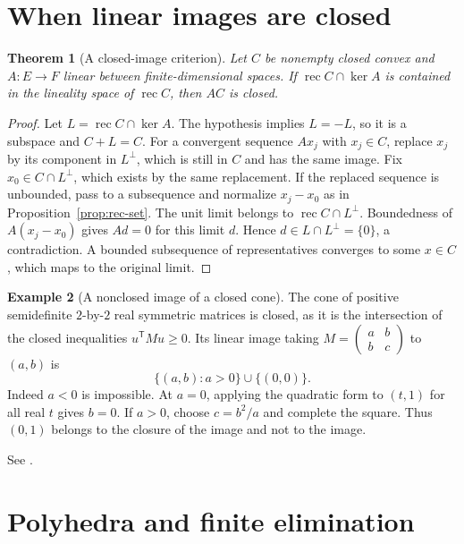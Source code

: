 \documentclass[11pt,oneside,openany]{book}
\theoremstyle{plain}
\newtheorem{theorem}{Theorem}[chapter]
\theoremstyle{definition}
\newtheorem{example}[theorem]{Example}
\theoremstyle{remark}
\begin{document}
\section{When linear images are closed}\label{v01-07}

\begin{theorem}[A closed-image criterion]\label{thm:closed-image}
Let \(C\) be nonempty closed convex and \(A:E\to F\) linear
between finite-dimensional spaces. If
\(\operatorname{rec}C\cap\ker A\) is contained in the lineality
space of \(\operatorname{rec}C\), then \(AC\) is closed.
\end{theorem}

\begin{proof}
Let \(L=\operatorname{rec}C\cap\ker A\). The hypothesis implies
\(L=-L\), so it is a subspace and \(C+L=C\).
For a convergent sequence \(Ax_j\) with \(x_j\in C\), replace
\(x_j\) by its component in \(L^\perp\), which is still in \(C\)
and has the same image. Fix \(x_0\in C\cap L^\perp\), which
exists by the same replacement. If the replaced sequence is
unbounded, pass to a subsequence and normalize \(x_j-x_0\)
as in Proposition~\ref{prop:rec-set}. The unit limit belongs
to \(\operatorname{rec}C\cap L^\perp\). Boundedness of
\(A(x_j-x_0)\) gives \(Ad=0\) for this limit \(d\).
Hence \(d\in L\cap L^\perp=\{0\}\), a contradiction.
A bounded subsequence of representatives converges to some
\(x\in C\), which maps to the original limit.
\end{proof}

\begin{example}[A nonclosed image of a closed cone]
The cone of positive semidefinite \(2\)-by-\(2\) real symmetric
matrices is closed, as it is the intersection of the closed
inequalities \(u^{\mathsf T}Mu\ge0\).
Its linear image taking \(M=\left(\begin{smallmatrix}a&b\\b&c\end{smallmatrix}\right)\)
to \((a,b)\) is
\[
 \{(a,b):a>0\}\cup\{(0,0)\}.
\]
Indeed \(a<0\) is impossible. At \(a=0\), applying the quadratic
form to \((t,1)\) for all real \(t\) gives \(b=0\).
If \(a>0\), choose \(c=b^2/a\) and complete the square.
Thus \((0,1)\) belongs to the closure of the image and not to the image.
\end{example}

See \cite[\S9, Theorem 9.1]{Rockafellar}.

\section{Polyhedra and finite elimination}\label{v01-08}
\end{document}
